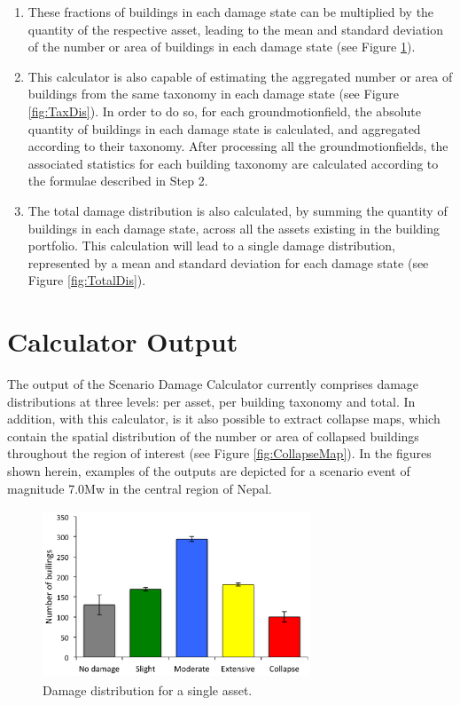 \begin{enumerate}
Where $m$ stands for the number of \glspl{groundmotionfield} simulated. 

\item These fractions of buildings in each damage state can be multiplied by the quantity of the respective asset, leading to the mean and standard deviation of the number or area of buildings in each damage state (see Figure \ref{fig:AssetDis}). 

\item This calculator is also capable of estimating the aggregated number or area of buildings from the same \gls{taxonomy} in each damage state (see Figure \ref{fig:TaxDis}). In order to do so, for each \gls{groundmotionfield}, the absolute quantity of buildings in each damage state is calculated, and aggregated according to their \gls{taxonomy}. After processing all the \glspl{groundmotionfield}, the associated statistics for each building \gls{taxonomy} are calculated according to the formulae described in Step 2.

\item The total damage distribution is also calculated, by summing the quantity of buildings in each damage state, across all the \glspl{asset} existing in the building portfolio. This calculation will lead to a single damage distribution, represented by a mean and standard deviation for each damage state (see Figure \ref{fig:TotalDis}).

\end{enumerate}

\section{Calculator Output}
The output of the Scenario Damage Calculator currently comprises damage distributions at three levels: per \gls{asset}, per building \gls{taxonomy} and total. In addition, with this calculator, is it also possible to extract collapse maps, which contain the spatial distribution of the number or area of collapsed buildings throughout the region of interest (see Figure \ref{fig:CollapseMap}). In the figures shown herein, examples of the outputs are depicted for a scenario event of magnitude 7.0Mw in the central region of Nepal.

\begin{figure}[ht]
\centering
\includegraphics[width=8cm,height=5cm]{./figures/risk/AssetDisaggregation.eps}
\caption{Damage distribution for a single asset.}
\label{fig:AssetDis}
\end{figure} 

